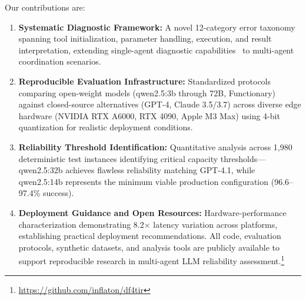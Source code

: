 \documentclass[conference]{IEEEtran}
\begin{document}

Our contributions are:

\begin{enumerate}
    \item \textbf{Systematic Diagnostic Framework:} A novel 12-category error taxonomy spanning tool initialization, parameter handling, execution, and result interpretation, extending single-agent diagnostic capabilities~\cite{kokane2024spectool} to multi-agent coordination scenarios.
    
    \item \textbf{Reproducible Evaluation Infrastructure:} Standardized protocols comparing open-weight models (qwen2.5:3b through 72B, Functionary) against closed-source alternatives (GPT-4, Claude 3.5/3.7) across diverse edge hardware (NVIDIA RTX A6000, RTX 4090, Apple M3 Max) using 4-bit quantization for realistic deployment conditions.
    
    \item \textbf{Reliability Threshold Identification:} Quantitative analysis across 1,980 deterministic test instances identifying critical capacity thresholds—qwen2.5:32b achieves flawless reliability matching GPT-4.1, while qwen2.5:14b represents the minimum viable production configuration (96.6--97.4\% success).
    
    \item \textbf{Deployment Guidance and Open Resources:} Hardware-performance characterization demonstrating 8.2$\times$ latency variation across platforms, establishing practical deployment recommendations. All code, evaluation protocols, synthetic datasets, and analysis tools are publicly available to support reproducible research in multi-agent LLM reliability assessment.\footnote{\url{https://github.com/inflaton/df4tir}}
\end{enumerate}

\end{document}
